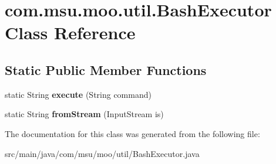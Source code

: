 \hypertarget{classcom_1_1msu_1_1moo_1_1util_1_1BashExecutor}{\section{com.\-msu.\-moo.\-util.\-Bash\-Executor Class Reference}
\label{classcom_1_1msu_1_1moo_1_1util_1_1BashExecutor}
}
\subsection*{Static Public Member Functions}
\begin{DoxyCompactItemize}
\item 
\hypertarget{classcom_1_1msu_1_1moo_1_1util_1_1BashExecutor_ae22f572f361bf166ac37bd59d239799e}{static String {\bfseries execute} (String command)}\label{classcom_1_1msu_1_1moo_1_1util_1_1BashExecutor_ae22f572f361bf166ac37bd59d239799e}

\item 
\hypertarget{classcom_1_1msu_1_1moo_1_1util_1_1BashExecutor_a80c3b04f25b6c06b8f68a9e6dbc018bc}{static String {\bfseries from\-Stream} (Input\-Stream is)}\label{classcom_1_1msu_1_1moo_1_1util_1_1BashExecutor_a80c3b04f25b6c06b8f68a9e6dbc018bc}

\end{DoxyCompactItemize}


The documentation for this class was generated from the following file\-:\begin{DoxyCompactItemize}
\item 
src/main/java/com/msu/moo/util/Bash\-Executor.\-java\end{DoxyCompactItemize}
